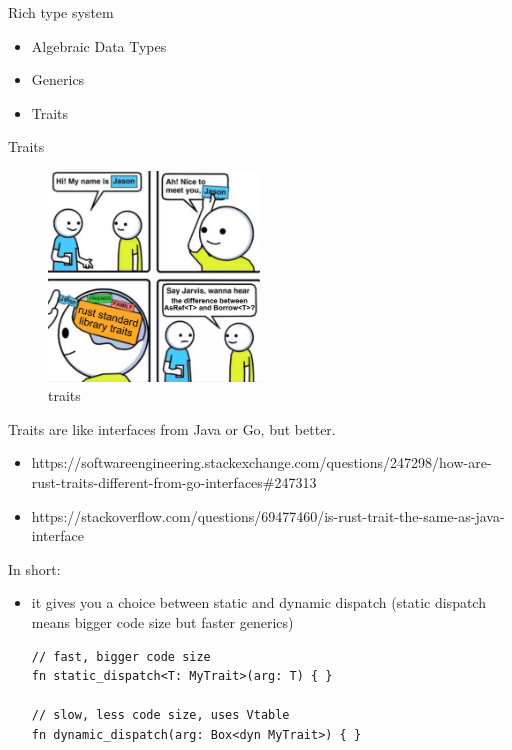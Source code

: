 \documentclass[
  9pt,
  ignorenonframetext,
]{beamer}
\providecommand{\tightlist}{%
  \setlength{\itemsep}{0pt}\setlength{\parskip}{0pt}}
\begin{document}
\begin{frame}{Rich type system}
\begin{itemize}
\tightlist
\item
  Algebraic Data Types
\item
  Generics
\item
  Traits
\end{itemize}
\end{frame}

\begin{frame}{Traits}
\protect\hypertarget{traits}{}
\begin{figure}
\centering
\includegraphics[width=0.5\textwidth,height=\textheight]{img/traits.jpg}
\caption{traits}
\end{figure}
\end{frame}

\begin{frame}
Traits are like interfaces from Java or Go, but better.

\begin{itemize}
\tightlist
\item
  https://softwareengineering.stackexchange.com/questions/247298/how-are-rust-traits-different-from-go-interfaces\#247313
\item
  https://stackoverflow.com/questions/69477460/is-rust-trait-the-same-as-java-interface
\end{itemize}
\end{frame}

\begin{frame}[fragile]
In short:

\begin{itemize}
\item
  it gives you a choice between static and dynamic dispatch (static
  dispatch means bigger code size but faster generics)

\begin{lstlisting}
// fast, bigger code size
fn static_dispatch<T: MyTrait>(arg: T) { }

// slow, less code size, uses Vtable
fn dynamic_dispatch(arg: Box<dyn MyTrait>) { }
\end{lstlisting}
\end{itemize}
\end{frame}
\end{document}
